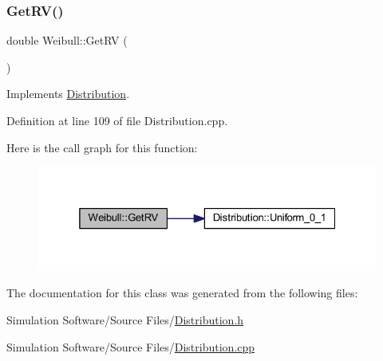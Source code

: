 \subsubsection{\texorpdfstring{Get\+R\+V()}{GetRV()}}
{\footnotesize\ttfamily double Weibull\+::\+Get\+RV (\begin{DoxyParamCaption}{ }\end{DoxyParamCaption})\hspace{0.3cm}{\ttfamily [virtual]}}



Implements \hyperlink{class_distribution_a63b433850d7b47d84eb69448f7916719}{Distribution}.



Definition at line 109 of file Distribution.\+cpp.

Here is the call graph for this function\+:\nopagebreak
\begin{figure}[H]
\begin{center}
\leavevmode
\includegraphics[width=325pt]{class_weibull_a0de3910ff51aeb87c49ccb5d34d1de0d_cgraph}
\end{center}
\end{figure}


The documentation for this class was generated from the following files\+:\begin{DoxyCompactItemize}
\item 
Simulation Software/\+Source Files/\hyperlink{_distribution_8h}{Distribution.\+h}\item 
Simulation Software/\+Source Files/\hyperlink{_distribution_8cpp}{Distribution.\+cpp}\end{DoxyCompactItemize}
